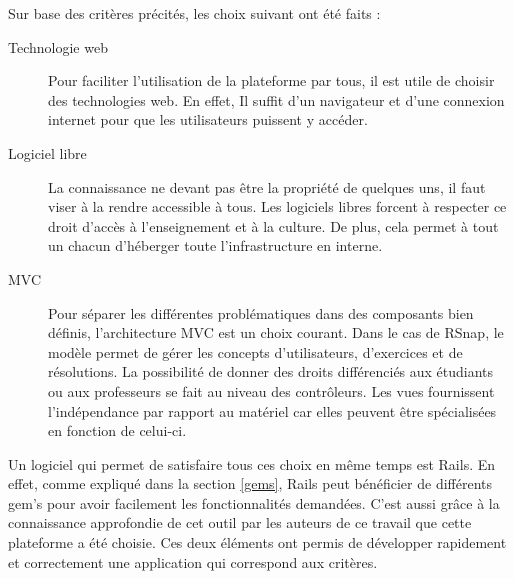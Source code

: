 Sur base des critères précités, les choix suivant ont été faits :
\begin{description}
  \item[Technologie web] Pour faciliter l'utilisation de la plateforme par tous, il est utile de choisir des technologies web. En effet, Il suffit d'un navigateur et d'une connexion internet pour que les utilisateurs puissent y accéder.
  \item[Logiciel libre] La connaissance ne devant pas être la propriété de quelques uns, il faut viser à la rendre accessible à tous. Les logiciels libres forcent à respecter ce droit d'accès à l'enseignement et à la culture. De plus, cela permet à tout un chacun d'héberger toute l'infrastructure en interne.
  \item[MVC] Pour séparer les différentes problématiques %
  dans des composants bien définis, l'architecture MVC est un choix courant. Dans le cas de RSnap, le modèle permet de gérer les concepts d'utilisateurs, d'exercices et de résolutions. La possibilité de donner des droits différenciés aux étudiants ou aux professeurs se fait au niveau des contrôleurs. Les vues fournissent l'indépendance par rapport au matériel car elles peuvent être spécialisées en fonction de celui-ci.
\end{description}
Un logiciel qui permet de satisfaire tous ces choix en même temps est Rails. %
En effet, comme expliqué dans la section \ref{gems}, Rails peut bénéficier de différents gem's pour avoir facilement les fonctionnalités demandées. C'est aussi grâce à la connaissance approfondie de cet outil par les auteurs de ce travail que cette plateforme a été choisie. Ces deux éléments ont permis de développer rapidement et correctement une application qui correspond aux critères. 


